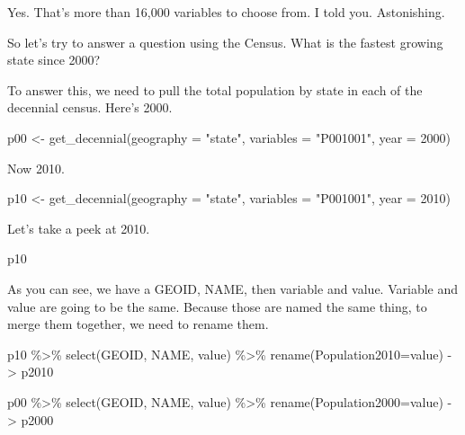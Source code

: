 \documentclass[
  letterpaper,
  DIV=11,
  numbers=noendperiod]{scrreprt}
\newenvironment{Shaded}{\begin{snugshade}}{\end{snugshade}}
\newcommand{\AttributeTok}[1]{\textcolor[rgb]{0.40,0.45,0.13}{#1}}
\newcommand{\DecValTok}[1]{\textcolor[rgb]{0.68,0.00,0.00}{#1}}
\newcommand{\FunctionTok}[1]{\textcolor[rgb]{0.28,0.35,0.67}{#1}}
\newcommand{\NormalTok}[1]{\textcolor[rgb]{0.00,0.23,0.31}{#1}}
\newcommand{\OtherTok}[1]{\textcolor[rgb]{0.00,0.23,0.31}{#1}}
\newcommand{\SpecialCharTok}[1]{\textcolor[rgb]{0.37,0.37,0.37}{#1}}
\newcommand{\StringTok}[1]{\textcolor[rgb]{0.13,0.47,0.30}{#1}}
\begin{document}
Yes. That's more than 16,000 variables to choose from. I told you.
Astonishing.

So let's try to answer a question using the Census. What is the fastest
growing state since 2000?

To answer this, we need to pull the total population by state in each of
the decennial census. Here's 2000.

\begin{Shaded}
\begin{Highlighting}[]
\NormalTok{p00 }\OtherTok{\textless{}{-}} \FunctionTok{get\_decennial}\NormalTok{(}\AttributeTok{geography =} \StringTok{"state"}\NormalTok{, }\AttributeTok{variables =} \StringTok{"P001001"}\NormalTok{, }\AttributeTok{year =} \DecValTok{2000}\NormalTok{)}
\end{Highlighting}
\end{Shaded}

Now 2010.

\begin{Shaded}
\begin{Highlighting}[]
\NormalTok{p10 }\OtherTok{\textless{}{-}} \FunctionTok{get\_decennial}\NormalTok{(}\AttributeTok{geography =} \StringTok{"state"}\NormalTok{, }\AttributeTok{variables =} \StringTok{"P001001"}\NormalTok{, }\AttributeTok{year =} \DecValTok{2010}\NormalTok{)}
\end{Highlighting}
\end{Shaded}

Let's take a peek at 2010.

\begin{Shaded}
\begin{Highlighting}[]
\NormalTok{p10}
\end{Highlighting}
\end{Shaded}

As you can see, we have a GEOID, NAME, then variable and value. Variable
and value are going to be the same. Because those are named the same
thing, to merge them together, we need to rename them.

\begin{Shaded}
\begin{Highlighting}[]
\NormalTok{p10 }\SpecialCharTok{\%\textgreater{}\%} \FunctionTok{select}\NormalTok{(GEOID, NAME, value) }\SpecialCharTok{\%\textgreater{}\%} \FunctionTok{rename}\NormalTok{(}\AttributeTok{Population2010=}\NormalTok{value) }\OtherTok{{-}\textgreater{}}\NormalTok{ p2010}

\NormalTok{p00 }\SpecialCharTok{\%\textgreater{}\%} \FunctionTok{select}\NormalTok{(GEOID, NAME, value) }\SpecialCharTok{\%\textgreater{}\%} \FunctionTok{rename}\NormalTok{(}\AttributeTok{Population2000=}\NormalTok{value) }\OtherTok{{-}\textgreater{}}\NormalTok{ p2000}
\end{Highlighting}
\end{Shaded}
\end{document}
